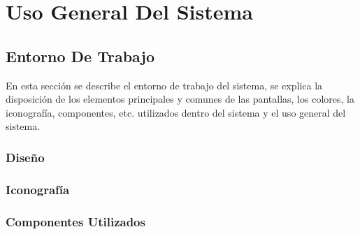 \documentclass[oneside,10pt,letterpaper]{book}
\begin{document}
\maketitle
\frontmatter
\tableofcontents
\mainmatter
\chapter{Uso General Del Sistema}
\section{Entorno De Trabajo}
En esta sección se describe el entorno de trabajo del sistema, se explica la disposición
de los elementos principales y comunes de las pantallas, los colores, la iconografía, componentes, etc.
utilizados dentro del sistema y el uso general del sistema.

	
\subsection{Diseño}
	

\subsection{Iconografía}
	


\subsection{Componentes Utilizados}
	
	





\end{document}
